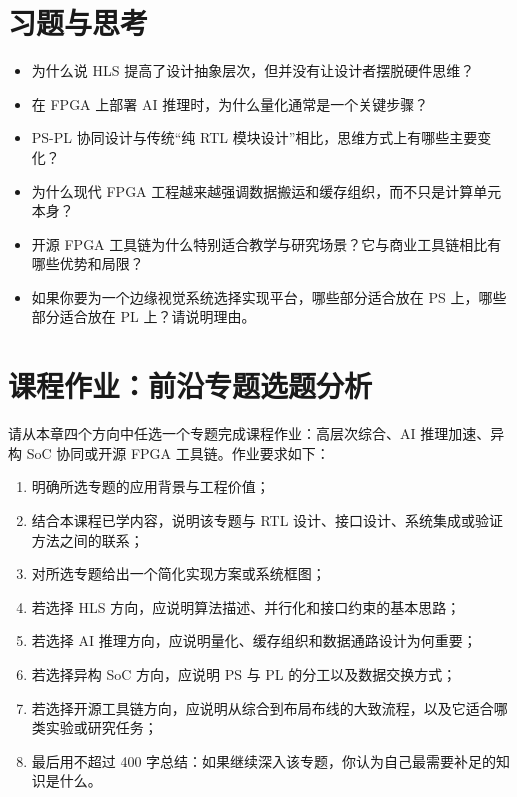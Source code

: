 \section{习题与思考}\label{ux4e60ux9898ux4e0eux601dux8003}

\begin{itemize}
\tightlist
\item
  为什么说 HLS 提高了设计抽象层次，但并没有让设计者摆脱硬件思维？
\item
  在 FPGA 上部署 AI 推理时，为什么量化通常是一个关键步骤？
\item
  PS-PL 协同设计与传统``纯 RTL
  模块设计''相比，思维方式上有哪些主要变化？
\item
  为什么现代 FPGA
  工程越来越强调数据搬运和缓存组织，而不只是计算单元本身？
\item
  开源 FPGA
  工具链为什么特别适合教学与研究场景？它与商业工具链相比有哪些优势和局限？
\item
  如果你要为一个边缘视觉系统选择实现平台，哪些部分适合放在 PS
  上，哪些部分适合放在 PL 上？请说明理由。
\end{itemize}

\section{课程作业：前沿专题选题分析}\label{ux8bfeux7a0bux4f5cux4e1aux524dux6cbfux4e13ux9898ux9009ux9898ux5206ux6790}

请从本章四个方向中任选一个专题完成课程作业：高层次综合、AI
推理加速、异构 SoC 协同或开源 FPGA 工具链。作业要求如下：

\begin{enumerate}
\def\labelenumi{\arabic{enumi}.}
\tightlist
\item
  明确所选专题的应用背景与工程价值；
\item
  结合本课程已学内容，说明该专题与 RTL
  设计、接口设计、系统集成或验证方法之间的联系；
\item
  对所选专题给出一个简化实现方案或系统框图；
\item
  若选择 HLS 方向，应说明算法描述、并行化和接口约束的基本思路；
\item
  若选择 AI 推理方向，应说明量化、缓存组织和数据通路设计为何重要；
\item
  若选择异构 SoC 方向，应说明 PS 与 PL 的分工以及数据交换方式；
\item
  若选择开源工具链方向，应说明从综合到布局布线的大致流程，以及它适合哪类实验或研究任务；
\item
  最后用不超过 400
  字总结：如果继续深入该专题，你认为自己最需要补足的知识是什么。
\end{enumerate}

